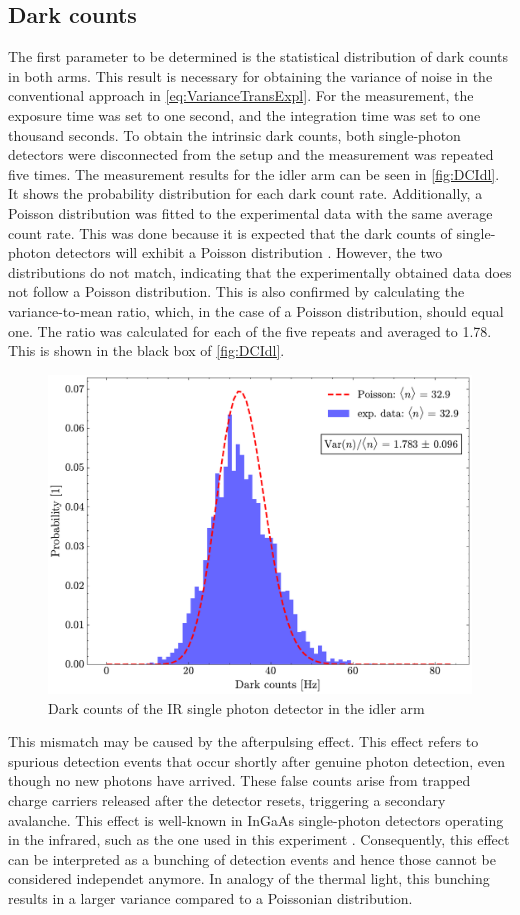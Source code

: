 \subsection{Dark counts}
The first parameter to be determined is the statistical distribution of dark counts in both arms. This result is necessary for obtaining the variance of noise in the conventional approach in \autoref{eq:VarianceTransExpl}. For the measurement, the exposure time was set to one second, and the integration time was set to one thousand seconds. To obtain the intrinsic dark counts, both single-photon detectors were disconnected from the setup and the measurement was repeated five times. \newline
The measurement results for the idler arm can be seen in \autoref{fig:DCIdl}. It shows the probability distribution for each dark count rate. Additionally, a Poisson distribution was fitted to the experimental data with the same average count rate. This was done because it is expected that the dark counts of single-photon detectors will exhibit a Poisson distribution \cite{foucheDetectionFalsealarmProbabilities2003}. However, the two distributions do not match, indicating that the experimentally obtained data does not follow a Poisson distribution. This is also confirmed by calculating the variance-to-mean ratio, which, in the case of a Poisson distribution, should equal one. The ratio was calculated for each of the five repeats and averaged to 1.78. This is shown in the black box of \autoref{fig:DCIdl}. 
\begin{figure}[tb!]
	\centering
	\includegraphics[width=.7\textwidth]{Images/DC_Idl.pdf}
	\caption{Dark counts of the IR single photon detector in the idler arm}
	\label{fig:DCIdl}
\end{figure}\newline
This mismatch may be caused by the afterpulsing effect. This effect refers to spurious detection events that occur shortly after genuine photon detection, even though no new photons have arrived. These false counts arise from trapped charge carriers released after the detector resets, triggering a secondary avalanche. This effect is well-known in InGaAs single-photon detectors operating in the infrared, such as the one used in this experiment \cite{laiImpactAfterpulsingEffects2024}. Consequently, this effect can be interpreted as a bunching of detection events and hence those cannot be considered independet anymore. In analogy of the thermal light, this bunching results in a larger variance compared to a Poissonian distribution. \newline
